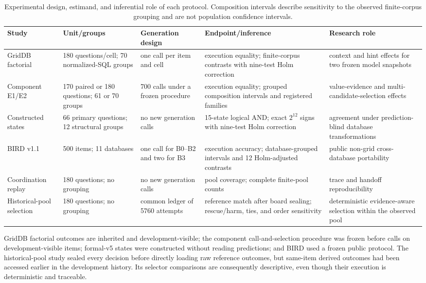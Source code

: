 \documentclass[applsci,article,submit,moreauthors]{Definitions/mdpi}
\begin{document}
\begin{table}[htbp]
\caption{Experimental design, estimand, and inferential role of each protocol. Composition intervals describe sensitivity to the observed finite-corpus grouping and are not population confidence intervals.}
\label{tab:protocol-master}\centering\scriptsize
\begin{tabular}{p{1.9cm}p{1.85cm}p{2.3cm}p{2.45cm}p{3.0cm}}
\toprule
Study & Unit/groups & Generation design & Endpoint/inference & Research role\\
\midrule
GridDB factorial & 180 questions/cell; 70 normalized-SQL groups & one call per item and cell & execution equality; finite-corpus contrasts with nine-test Holm correction & context and hint effects for two frozen model snapshots\\
Component E1/E2 & 170 paired or 180 questions; 61 or 70 groups & 700 calls under a frozen procedure & execution equality; grouped composition intervals and registered families & value-evidence and multi-candidate-selection effects\\
Constructed states & 66 primary questions; 12 structural groups & no new generation calls & 15-state logical AND; exact $2^{12}$ signs with nine-test Holm correction & agreement under prediction-blind database transformations\\
BIRD v1.1 & 500 items; 11 databases & one call for B0--B2 and two for B3 & execution accuracy; database-grouped intervals and 12 Holm-adjusted contrasts & public non-grid cross-database portability\\
Coordination replay & 180 questions; no grouping & no new generation calls & pool coverage; complete finite-pool counts & trace and handoff reproducibility\\
Historical-pool selection & 180 questions; no grouping & common ledger of 5760 attempts & reference match after board sealing; rescue/harm, ties, and order sensitivity & deterministic evidence-aware selection within the observed pool\\
\bottomrule
\end{tabular}
\end{table}

GridDB factorial outcomes are inherited and development-visible; the component call-and-selection procedure was frozen before calls on development-visible items; formal-v5 states were constructed without reading predictions; and BIRD used a frozen public protocol. The historical-pool study sealed every decision before directly loading raw reference outcomes, but same-item derived outcomes had been accessed earlier in the development history. Its selector comparisons are consequently descriptive, even though their execution is deterministic and traceable.
\end{document}
